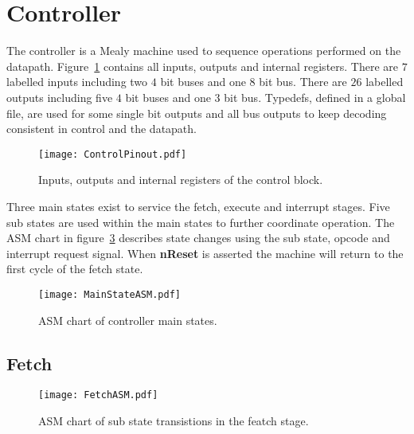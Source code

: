 \section{Controller}

The controller is a Mealy machine used to sequence operations performed on the datapath.
Figure~\ref{fig:ControlBlock} contains all inputs, outputs and internal registers.
There are $7$ labelled inputs including two $4$ bit buses and one $8$ bit bus.
There are $26$ labelled outputs including five $4$ bit buses and one $3$ bit bus.
Typedefs, defined in a global file, are used for some single bit outputs and all bus outputs to keep decoding consistent in control and the datapath. 


\begin{figure}[ht]
   \centering
    \texttt{[image: ControlPinout.pdf]}
		\caption{Inputs, outputs and internal registers of the control block.}%
   \label{fig:ControlBlock}
\end{figure}

Three main states exist to service the fetch, execute and interrupt stages.
Five sub states are used within the main states to further coordinate operation.
The ASM chart in figure~\ref{fig:MainStateASM} describes state changes using the sub state, opcode and interrupt request signal.   
When \textbf{nReset} is asserted the machine will return to the first cycle of the fetch state.


\begin{figure}[ht]
   \centering
    \texttt{[image: MainStateASM.pdf]}
		\caption{ASM chart of controller main states.}%
   \label{fig:MainStateASM}
\end{figure}








\subsection{Fetch}


\begin{figure}[ht]
   \centering
    \texttt{[image: FetchASM.pdf]}
		\caption{ASM chart of sub state transistions in the featch stage.}%
   \label{fig:MainStateASM}
\end{figure}





